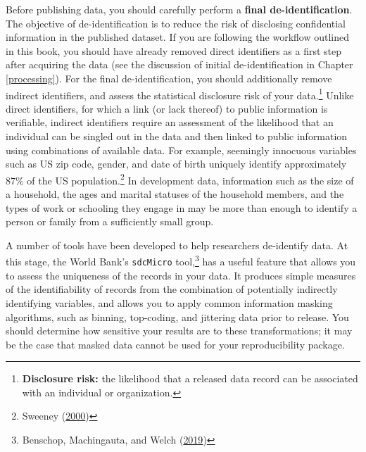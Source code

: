 \documentclass[
]{book}
\begin{document}
Before publishing data,
you should carefully perform a \textbf{final de-identification}.
The objective of de-identification is to reduce the risk of disclosing confidential information in the published dataset.
If you are following the workflow outlined in this book,
you should have already removed direct identifiers as a first step after acquiring the data
(see the discussion of initial de-identification in Chapter \ref{processing}).
For the final de-identification, you should additionally remove
indirect identifiers, and assess the statistical disclosure risk of your data.\footnote{\textbf{Disclosure risk:} the likelihood that a released data record can be associated with an individual or
  organization.}
Unlike direct identifiers, for which a link (or lack thereof) to public information is verifiable,
indirect identifiers require an assessment of the likelihood
that an individual can be singled out in the data
and then linked to public information using combinations of available data.
For example, seemingly innocuous variables such as US zip code,
gender, and date of birth uniquely identify
approximately 87\% of the US population.\footnote{Sweeney (\protect\hyperlink{ref-Sweeney2000}{2000})}
In development data, information such as the size of a household,
the ages and marital statuses of the household members,
and the types of work or schooling they engage in
may be more than enough to identify a person or family
from a sufficiently small group.

A number of tools have been developed to help researchers de-identify data.
At this stage, the World Bank's \texttt{sdcMicro} tool,\footnote{Benschop, Machingauta, and Welch (\protect\hyperlink{ref-benschop2019statistical}{2019})}
has a useful feature
that allows you to assess the uniqueness of the records in your data.
It produces simple measures of the identifiability of records from
the combination of potentially indirectly identifying variables,
and allows you to apply common information masking algorithms,
such as binning, top-coding, and jittering data prior to release.
You should determine how sensitive your results are to these transformations;
it may be the case that masked data cannot be used for your reproducibility package.
\end{document}

